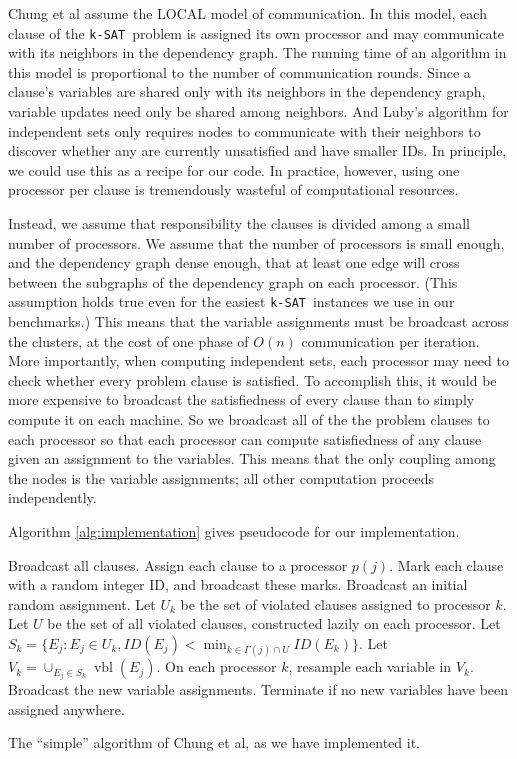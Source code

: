\documentclass[twocolumn]{article}
\newcommand{\ksat}{\texttt{k-SAT}~}
\begin{document}
Chung et al assume the LOCAL model of communication.  In this model, each clause of the \ksat problem is assigned its own processor and may communicate with its neighbors in the dependency graph.  The running time of an algorithm in this model is proportional to the number of communication rounds.  Since a clause's variables are shared only with its neighbors in the dependency graph, variable updates need only be shared among neighbors.  And Luby's algorithm for independent sets only requires nodes to communicate with their neighbors to discover whether any are currently unsatisfied and have smaller IDs.  In principle, we could use this as a recipe for our code.  In practice, however, using one processor per clause is tremendously wasteful of computational resources.

Instead, we assume that responsibility the clauses is divided among a small number of processors.  We assume that the number of processors is small enough, and the dependency graph dense enough, that at least one edge will cross between the subgraphs of the dependency graph on each processor.  (This assumption holds true even for the easiest \ksat instances we use in our benchmarks.)  This means that the variable assignments must be broadcast across the clusters, at the cost of one phase of $O(n)$ communication per iteration.  More importantly, when computing independent sets, each processor may need to check whether every problem clause is satisfied.  To accomplish this, it would be more expensive to broadcast the satisfiedness of every clause than to simply compute it on each machine.  So we broadcast all of the the problem clauses to each processor so that each processor can compute satisfiedness of any clause given an assignment to the variables.  This means that the only coupling among the nodes is the variable assignments; all other computation proceeds independently.

Algorithm \ref{alg:implementation} gives pseudocode for our implementation.

\begin{algorithm}[H]
\label{alg:implementation}
\begin{algorithmic}
\State Broadcast all clauses.
\State Assign each clause to a processor $p(j)$.
\State Mark each clause with a random integer ID, and broadcast these marks.
\State Broadcast an initial random assignment.
  \State Let $U_k$ be the set of violated clauses assigned to processor $k$.
  \State Let $U$ be the set of all violated clauses, constructed lazily on each processor.
  \State Let $S_k = \{E_j: E_j \in U_k, ID(E_j) < \min_{k \in \Gamma(j) \cap U} ID(E_k)\}$.
  \State Let $V_k = \cup_{E_j \in S_k} \operatorname{vbl}(E_j)$.
  \State On each processor $k$, resample each variable in $V_k$.
  \State Broadcast the new variable assignments.
  \State Terminate if no new variables have been assigned anywhere.
\EndWhile
\end{algorithmic}
\caption{The ``simple'' algorithm of Chung et al, as we have implemented it.}
\end{algorithm}
\end{document}
